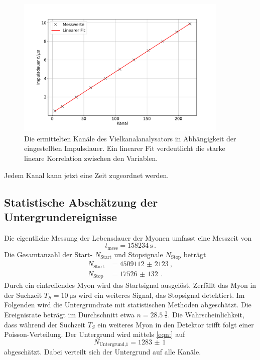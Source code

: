 \begin{figure}
    \centering
    \includegraphics[width=0.9\textwidth]{content/plots/calibration.pdf}
    \caption{Die ermittelten Kanäle des Vielkanalanalysators in Abhängigkeit der eingestellten Impulsdauer.
    Ein linearer Fit verdeutlicht die starke lineare Korrelation zwischen den Variablen.
    }
    \label{fig:kalibration}
\end{figure}
Jedem Kanal kann jetzt eine Zeit zugeordnet werden.
\FloatBarrier

\subsection{Statistische Abschätzung der Untergrundereignisse}
Die eigentliche Messung der Lebensdauer der Myonen umfasst eine Messzeit von
\begin{equation*}
    t_\text{mess} = \qty{158234}{\second} \,.
\end{equation*}
Die Gesamtanzahl der Start- $N_\text{Start}$ und Stopsignale $N_\text{Stop}$ beträgt
\begin{align*}
    N_\text{Start} &= \qty{4509112(2123)}{}, \\
    N_\text{Stop} &= \qty{17526(132)}{} \,.
\end{align*}
Durch ein eintreffendes Myon wird das Startsignal ausgelöst.
Zerfällt das Myon in der Suchzeit $T_S = \qty{10}{\micro\second}$ wird ein weiteres Signal, das Stopsignal detektiert.
Im Folgenden wird die Untergrundrate mit statistischen Methoden abgeschätzt.
Die Ereignisrate beträgt im Durchschnitt etwa $n = \qty{28.5}{\frac{1}{\second}}$.
Die Wahrscheinlichkeit, dass während der Suchzeit $T_S$ ein weiteres Myon in den Detektor trifft folgt einer Poisson-Verteilung.  
Der Untergrund wird mittels \autoref{eqn:} auf %
\begin{equation}
    N_\text{Untergrund,1} = \qty{1283(1)}{}
\end{equation}
abgeschätzt.
Dabei verteilt sich der Untergrund auf alle Kanäle.
\FloatBarrier

